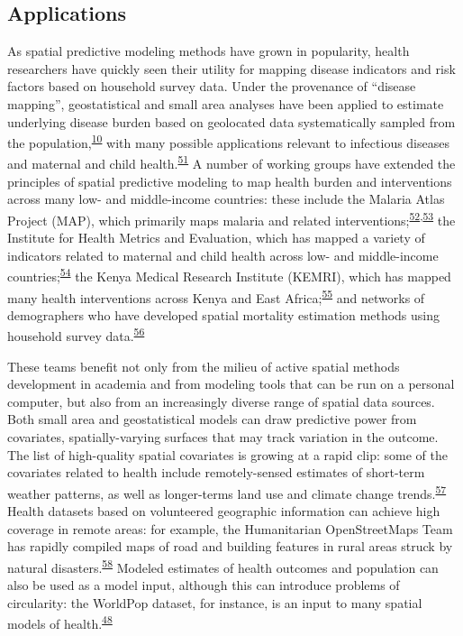 \documentclass[
]{article}
\begin{document}
\hypertarget{applications}{%
\subsection{Applications}\label{applications}}

As spatial predictive modeling methods have grown in popularity, health researchers have quickly seen their utility for mapping disease indicators and risk factors based on household survey data. Under the provenance of ``disease mapping'', geostatistical and small area analyses have been applied to estimate underlying disease burden based on geolocated data systematically sampled from the population,\textsuperscript{\protect\hyperlink{ref-Diggle2016}{10}} with many possible applications relevant to infectious diseases and maternal and child health.\textsuperscript{\protect\hyperlink{ref-Pigott2015}{51}} A number of working groups have extended the principles of spatial predictive modeling to map health burden and interventions across many low- and middle-income countries: these include the Malaria Atlas Project (MAP), which primarily maps malaria and related interventions;\textsuperscript{\protect\hyperlink{ref-Weiss2019}{52},\protect\hyperlink{ref-Nguyen2019}{53}} the Institute for Health Metrics and Evaluation, which has mapped a variety of indicators related to maternal and child health across low- and middle-income countries;\textsuperscript{\protect\hyperlink{ref-Osgood-Zimmerman2018}{54}} the Kenya Medical Research Institute (KEMRI), which has mapped many health interventions across Kenya and East Africa;\textsuperscript{\protect\hyperlink{ref-Maina2019}{55}} and networks of demographers who have developed spatial mortality estimation methods using household survey data.\textsuperscript{\protect\hyperlink{ref-Wakefield2020}{56}}

These teams benefit not only from the milieu of active spatial methods development in academia and from modeling tools that can be run on a personal computer, but also from an increasingly diverse range of spatial data sources. Both small area and geostatistical models can draw predictive power from covariates, spatially-varying surfaces that may track variation in the outcome. The list of high-quality spatial covariates is growing at a rapid clip: some of the covariates related to health include remotely-sensed estimates of short-term weather patterns, as well as longer-terms land use and climate change trends.\textsuperscript{\protect\hyperlink{ref-Ericksen2011}{57}} Health datasets based on volunteered geographic information can achieve high coverage in remote areas: for example, the Humanitarian OpenStreetMaps Team has rapidly compiled maps of road and building features in rural areas struck by natural disasters.\textsuperscript{\protect\hyperlink{ref-Thomson2019}{58}} Modeled estimates of health outcomes and population can also be used as a model input, although this can introduce problems of circularity: the WorldPop dataset, for instance, is an input to many spatial models of health.\textsuperscript{\protect\hyperlink{ref-Tatem2017}{48}}
\end{document}

